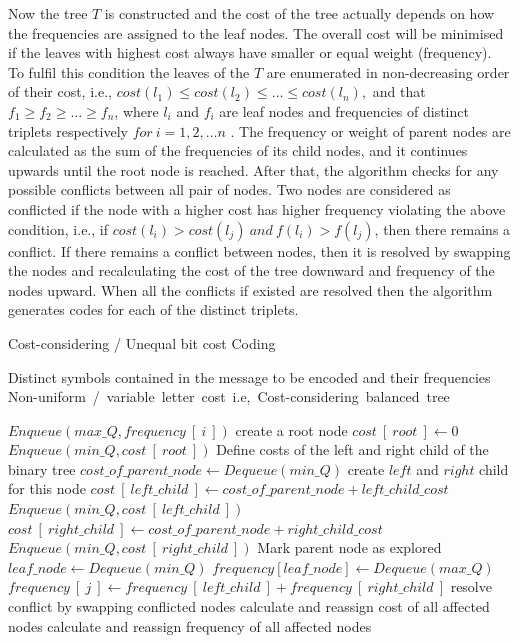 \documentclass[preprint,12pt]{elsarticle}
\begin{document}
Now the tree $T$ is constructed and the cost of the tree actually depends on how the frequencies are assigned to the leaf nodes. The overall cost will be minimised if the leaves with highest cost always have smaller or equal weight (frequency). To fulfil this condition the leaves of the $T$ are enumerated in non-decreasing order of their cost, i.e., $cost(l_1)\leq cost(l_2)\leq \ldots \leq cost(l_n),$ and that $f_1 \geq f_2 \geq \ldots\geq f_n$, where $l_i$ and $f_i$ are leaf nodes and frequencies of distinct triplets respectively $for~ i=1,2,\ldots n$ . The frequency or weight of parent nodes are calculated as the sum of the frequencies of its child nodes, and it continues upwards until the root node is reached. After that, the algorithm checks for any possible conflicts between all pair of nodes. Two nodes are considered as conflicted if the node with a higher cost has higher frequency violating the above condition, i.e., if $cost(l_i)> cost(l_j)~and~f(l_i)>f(l_j)$, then there remains a conflict.  If there remains a conflict between nodes, then it is resolved by swapping the nodes and recalculating the cost of the tree downward and frequency of the nodes upward.  When all the conflicts if existed are resolved then the algorithm generates codes for each of the distinct triplets.   
\begin{algorithm}[!btph]
\caption{Cost-considering / Unequal bit cost Coding}
\label{alg1}

\begin{algorithmic}[1]
\REQUIRE Distinct symbols contained in the message to be encoded and their frequencies 
\ENSURE Non-uniform\ /\ variable\ letter\ cost\ i.e,\ Cost-considering\ balanced\ tree

\STATE $ Enqueue\left(max\_Q , frequency~[~i~]\right)$
\ENDFOR
\STATE create a root node
\STATE $cost~[~root~]\leftarrow 0$
\STATE $Enqueue\left(min\_Q , cost~[~root~]\right)$
\STATE Define costs of the left and right child of the binary tree
\REPEAT 
\STATE $cost\_of\_parent\_node\leftarrow Dequeue\left(min\_Q\right)$
\STATE create $left$ and $right$ child for this node
\STATE $cost~[~left\_child~]\leftarrow cost\_of\_parent\_node+left\_child\_cost$
\STATE $Enqueue\left(min\_Q , cost~[~left\_child~]\right)$
\STATE $cost~[~right\_child~]\leftarrow cost\_of\_parent\_node+right\_child\_cost$
\STATE $Enqueue\left(min\_Q , cost~[~right\_child~]\right)$
\STATE Mark parent node as explored
\STATE $leaf\_node\leftarrow Dequeue\left(min\_Q\right)$
\STATE $frequency[leaf\_node]\leftarrow Dequeue\left(max\_Q\right)$
\ENDWHILE
{} 
\STATE $frequency~[~j~]\leftarrow frequency~[~left\_child~]+frequency~[~right\_child~]$
\ENDFOR
\REPEAT
{} 
\STATE resolve conflict by swapping conflicted nodes
\STATE calculate and reassign cost of all affected nodes
\STATE calculate and reassign frequency of all affected nodes 
\ENDIF
{}
\end{algorithmic}
\end{algorithm}
\end{document}
